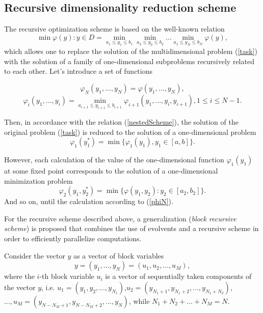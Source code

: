 \documentclass{svproc}
\begin{document}
\subsection{Recursive dimensionality reduction scheme}

The recursive optimization scheme is based on the well-known relation
\begin{equation}
\label{nestedScheme}
\min{\varphi(y):y\in D}=\min_{a_1\leqslant y_1\leqslant b_1}\min_{a_2\leqslant y_2\leqslant b_2}\dots\min_{a_1\leqslant y_N\leqslant b_N}\varphi(y),
\end{equation}
which allows one to replace the solution of the multidimensional problem (\ref{task}) with the solution of a family of one-dimensional subproblems recursively related to each other.
Let's introduce a set of functions

\begin{equation}
\label{phiN}
\varphi_N(y_1,\dots,y_N)=\varphi(y_1,\dots,y_N),
\end{equation}
\begin{equation}
\label{phiI_}
\varphi_i(y_1,\dots,y_i)=\min_{a_{i+1}\leqslant y_{i+1} \leqslant b_{i+1}}\varphi_{i+1}(y_1,\dots,y_i,y_{i+1}),1\leqslant i\leqslant N-1.
\end{equation}

Then, in accordance with the relation (\ref{nestedScheme}), the solution of the original problem (\ref{task}) is reduced to the solution of a one-dimensional problem
\begin{equation}
\label{phiFirst}
\varphi_1(y_1^*)=\min\{\varphi_1(y_1),y_1\in [a,b]\}.
\end{equation}

However, each calculation of the value of the one-dimensional function  \(\varphi_1(y_1)\) at some fixed point corresponds to the solution of a one-dimensional minimization problem 
\begin{displaymath}
\label{phi2}
\varphi_2(y_1,y_2^*)=\min\{\varphi(y_1,y_2):y_2\in [a_2,b_2]\}.
\end{displaymath}
And so on, until the calculation   according to (\ref{phiN}). 

For the recursive scheme described above, a generalization (\textit{block recursive scheme}) is proposed that combines the use of evolvents and a recursive scheme in order to efficiently parallelize computations.

Consider the vector $y$ as a vector of block variables
\begin{displaymath}
y=(y_1,\dots,y_N)=(u_1,u_2,\dots,u_M),
\end{displaymath}
where the \(i\)-th block variable \(u_i\) is a vector of sequentially taken components of the vector \(y\), i.e. $u_1=(y_1,y_2,\dots,y_{N_1})$,$u_2=(y_{N_1+1},y_{N_1+2},\dots,y_{N_1+N_2})$,$\dots,u_M=(y_{N-N_M+1},y_{N-N_M+2},\dots,y_N)$, while \(N_1+N_2+\dots+N_M=N\).
\end{document}
